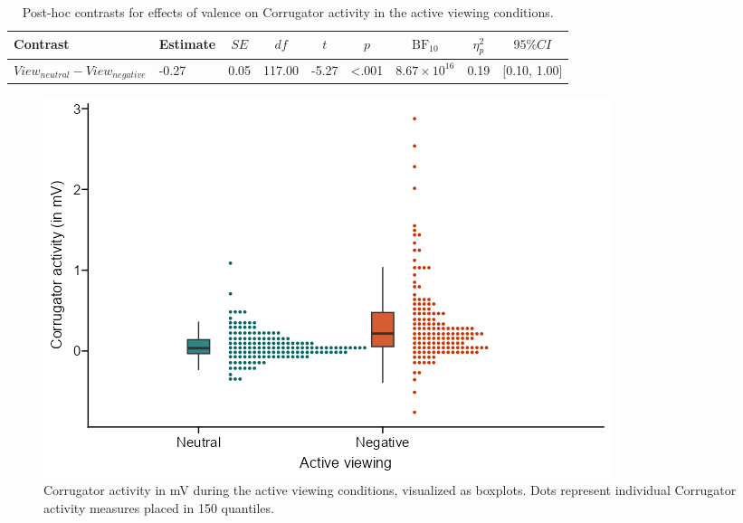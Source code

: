 \documentclass[
  man,floatsintext]{apa6}
\begin{document}
\begin{table}[H]

\begin{center}
\begin{threeparttable}

\caption{\label{tab:SupplEffectCorrView}Post-hoc contrasts for effects of valence on Corrugator activity in the active viewing conditions.}

\footnotesize{

\begin{tabular}{lllllllll}
\toprule
Contrast & \multicolumn{1}{c}{Estimate} & \multicolumn{1}{c}{$SE$} & \multicolumn{1}{c}{$df$} & \multicolumn{1}{c}{$t$} & \multicolumn{1}{c}{$p$} & \multicolumn{1}{c}{$\mathrm{BF}_{\textrm{10}}$} & \multicolumn{1}{c}{$\eta_{p}^{2}$} & \multicolumn{1}{c}{$95\% CI$}\\
\midrule
$View_{neutral} - View_{negative}$ & -0.27 & 0.05 & 117.00 & -5.27 & <.001 & $8.67 \times 10^{16}$ & 0.19 & {}[0.10, 1.00]\\
\bottomrule
\end{tabular}

}

\end{threeparttable}
\end{center}

\end{table}

\begin{figure}[H]
\includegraphics[width=\textwidth]{figures/FigCorrView} \caption{Corrugator activity in mV during the active viewing conditions, visualized as boxplots. Dots represent individual Corrugator activity measures placed in 150 quantiles.}\label{fig:SupplFigCorrView}
\end{figure}
\end{document}
